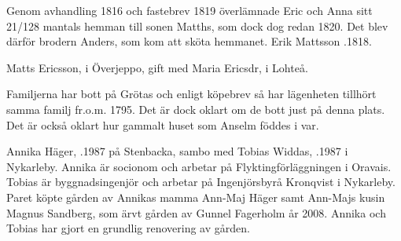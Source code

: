 Genom avhandling 1816 och fastebrev 1819 överlämnade Eric och Anna sitt 21/128 mantals hemman till sonen Matths, som dock dog redan 1820. Det blev därför brodern Anders, som kom att sköta hemmanet.
Erik Mattsson .1818.


%
Matts Ericsson,  i Överjeppo, gift med Maria Ericsdr,  i Lohteå.
\begin{jhchildren}
  \item {}
  \item {}
  \item {}
  \item {}
  \item {}
  \item {}
  \item {}
  \item {}
  \item {}
  \item {}
\end{jhchildren}

Familjerna har bott på Grötas och  enligt köpebrev så har lägenheten tillhört samma familj fr.o.m. 1795. Det är dock oklart om de bott just på denna plats. Det är också oklart hur gammalt huset som Anselm föddes i var.



%



%
Annika Häger, .1987 på Stenbacka, sambo med Tobias Widdas, .1987 i Nykarleby. Annika är socionom och arbetar på Flyktingförläggningen i Oravais. Tobias är byggnadsingenjör och arbetar på Ingenjörsbyrå Kronqvist i Nykarleby. Paret köpte gården av Annikas mamma Ann-Maj Häger samt Ann-Majs kusin Magnus Sandberg, som ärvt gården av Gunnel Fagerholm år 2008. Annika och Tobias har gjort en grundlig renovering av gården.



